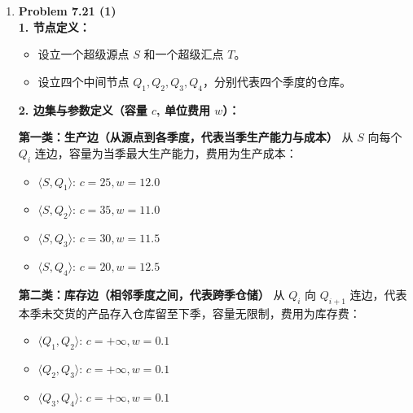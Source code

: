 \documentclass{ctexart}
\begin{document}
\begin{enumerate}[label=\arabic*.]
\begin{enumerate}[label=(\arabic*)]
\begin{algorithm}[H]
{{                    
                    
                    $F \leftarrow F + f_{\text{push}}$\;
                    $C \leftarrow C + f_{\text{push}} \times w_P$\;
                    更新路径 $P$ 上所有正反向边的流量 $f$\;
                    
                }
            }  
            \Return 最大可用流量 $F$\;
        \end{algorithm}
        \end{enumerate}
    \item \textbf{Problem 7.21 (1)}\\
        \textbf{1. 节点定义：}
        \begin{itemize}
            \item 设立一个超级源点 $S$ 和一个超级汇点 $T$。
            \item 设立四个中间节点 $Q_1, Q_2, Q_3, Q_4$，分别代表四个季度的仓库。
        \end{itemize}

        \textbf{2. 边集与参数定义（容量 $c$, 单位费用 $w$）：}

        \textbf{第一类：生产边（从源点到各季度，代表当季生产能力与成本）}
        从 $S$ 向每个 $Q_i$ 连边，容量为当季最大生产能力，费用为生产成本：
        \begin{itemize}
            \item $\langle S, Q_1 \rangle$: $c = 25, w = 12.0$
            \item $\langle S, Q_2 \rangle$: $c = 35, w = 11.0$
            \item $\langle S, Q_3 \rangle$: $c = 30, w = 11.5$
            \item $\langle S, Q_4 \rangle$: $c = 20, w = 12.5$
        \end{itemize}

        \textbf{第二类：库存边（相邻季度之间，代表跨季仓储）}
        从 $Q_i$ 向 $Q_{i+1}$ 连边，代表本季未交货的产品存入仓库留至下季，容量无限制，费用为库存费：
        \begin{itemize}
            \item $\langle Q_1, Q_2 \rangle$: $c = +\infty, w = 0.1$
            \item $\langle Q_2, Q_3 \rangle$: $c = +\infty, w = 0.1$
            \item $\langle Q_3, Q_4 \rangle$: $c = +\infty, w = 0.1$
        \end{itemize}


\end{enumerate}
\end{document}

